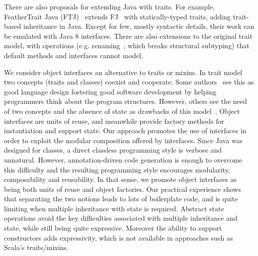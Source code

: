 There are also proposals for extending Java with traits. For
example, FeatherTrait Java (FTJ)~\cite{Liquori08ftj} extends
FJ~\cite{Igarashi01FJ} with statically-typed traits, adding trait-based
inheritance in Java.  Except for few, mostly syntactic details, their work can
be emulated with Java 8 interfaces. There are also extensions to the original
trait model, with operations (e.g. renaming~\cite{reppy2006foundation}, which breaks
structural subtyping) that default methods and interfaces cannot
model.

\savespace
{}
We consider object interfaces an alternative to traits or mixins. In
trait model two concepts (traits and classes) coexist and cooperate. Some
authors~\cite{BettiniDSS13} see this as good language design fostering good
software development by helping programmers think about the program structures.
However, others see the need of two concepts and the
absence of state as drawbacks of this model~\cite{malayeri2009cz}.  Object
interfaces are units of reuse, and meanwhile provide factory methods
for instantiation and support state. Our approach promotes the use of
interfaces in order to exploit the modular composition
offered by interfaces. Since Java was designed for classes, a direct classless
programming style is verbose and unnatural. However, annotation-driven code
generation is enough to overcome this difficulty and the resulting programming
style encourages modularity, composability and reusability. %
In that sense, we promote object interfaces as being both units of
reuse and object factories. Our practical experience shows that
separating the two notions leads to lots of boilerplate code, and is quite
limiting when multiple inheritance with state is required.  Abstract state
operations avoid the key difficulties associated with multiple inheritance and
state, while still being quite expressive. Moreover the ability to support
constructors adds expressivity, which is not available in approaches
such as Scala's traits/mixins.





